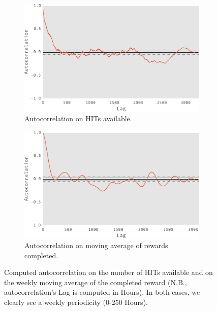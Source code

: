 \begin{figure}[t!]
    \begin{subfigure}[b]{0.48\textwidth}
        \centering
        \includegraphics[width=\textwidth]{figures/out1}
        \caption{Autocorrelation on HITs available.}
        \label{fig:achitav}
    \end{subfigure}
    \hfill
    \begin{subfigure}[b]{0.48\textwidth}
        \centering
        \includegraphics[width=\textwidth]{figures/macac}
        \caption{Autocorrelation on moving average of rewards completed.}
        \label{fig:acmac}
    \end{subfigure}
       
	\caption{Computed autocorrelation on the number of HITs available and on the weekly moving average of the completed reward (N.B., autocorrelation's Lag is computed in Hours). In both cases, we clearly see a weekly periodicity (0-250 Hours).}
	\label{fig:autocorrelation2}
\end{figure}
